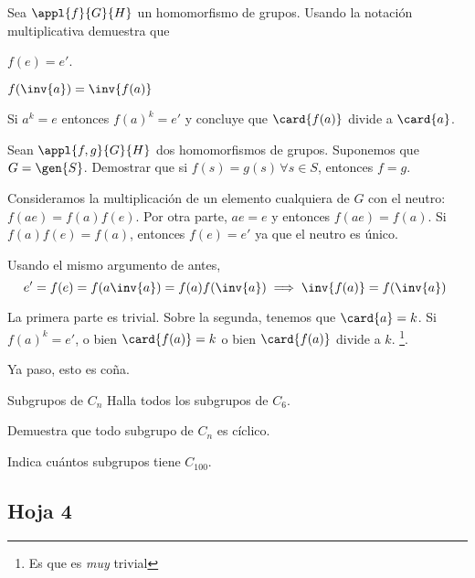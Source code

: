 \documentclass[nochap]{apuntes}
\begin{document}
\begin{problem}[6] Sea $\appl{f}{G}{H}$ un homomorfismo de grupos. Usando la notación multiplicativa demuestra que 

\ppart $f(e) = e'$.

\ppart $f(\inv{a}) = \inv{f(a)}$

\ppart Si $a^k = e$ entonces $f(a)^k = e'$ y concluye que $\card{f(a)}$ divide a $\card{a}$.

\ppart Sean $\appl{f,g}{G}{H}$ dos homomorfismos de grupos. Suponemos que $G=\gen{S}$. Demostrar que si $f(s) = g(s)\,∀s∈S$, entonces $f=g$.

\solution

\spart Consideramos la multiplicación de un elemento cualquiera de $G$ con el neutro: $f(ae) = f(a)f(e)$. Por otra parte, $ae = e$ y entonces $f(ae)=f(a)$. Si $f(a)f(e)=f(a)$, entonces $f(e) = e'$ ya que el neutro es único.

\spart Usando el mismo argumento de antes, \[ e' = f(e) = f(a\inv{a}) = f(a) f(\inv{a}) \implies \inv{f(a)} = f(\inv{a}) \]

\spart La primera parte es trivial. Sobre la segunda, tenemos que $\card{a} = k$. Si $f(a)^k=e'$, o bien $\card{f(a)} = k$ o bien $\card{f(a)}$ divide a $k$. \footnote{Es que es \textit{muy} trivial}.

\spart Ya paso, esto es coña.
 
\end{problem}

\begin{problem}[10] Subgrupos de $C_n$
\ppart Halla todos los subgrupos de $C_6$. 

\ppart Demuestra que todo subgrupo de $C_n$ es cíclico.

\ppart Indica cuántos subgrupos tiene $C_{100}$.

\solution


\end{problem}

\subsection{Hoja 4}
\end{document}
